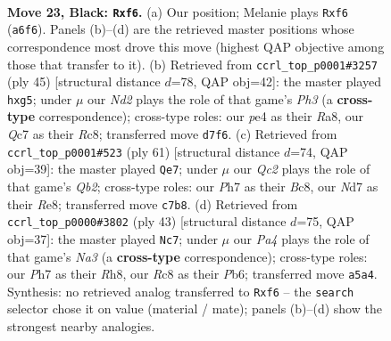 \documentclass[11pt]{article}
\begin{document}
\clearpage

\begin{figure}[p]\centering
\begin{subfigure}{0.46\textwidth}\centering
\resizebox{\linewidth}{!}{%
\newchessgame
\chessboard[
  setfen={2r3k1/1bqn1p1p/r4Bp1/pp1Pp3/4P3/1PP3P1/4KP1P/R1Q3NR b - - 0 23},
  showmover=false,
  pgfstyle=straightmove, color=movearrow, markmove={a6-f6}
]}
\caption{}
\end{subfigure}\hfill
\begin{subfigure}{0.46\textwidth}\centering
\resizebox{\linewidth}{!}{%
\newchessgame
\chessboard[
  setfen={r1r3k1/1p1n1pp1/p2pq2p/6B1/PPPPp3/7P/R3QPP1/2R1N1K1 b - - 0 23},
  showmover=false,
  pgfstyle=straightmove, color=movearrow, markmove={h6-g5}
]}
\caption{}
\end{subfigure}
\\[4pt]
\begin{subfigure}{0.46\textwidth}\centering
\resizebox{\linewidth}{!}{%
\newchessgame
\chessboard[
  setfen={1rb1r1k1/1q4np/p2p2p1/2pP1p2/4P3/R4PPP/1PN3B1/1RQ3K1 b - - 0 31},
  showmover=false,
  pgfstyle=straightmove, color=movearrow, markmove={b7-e7}
]}
\caption{}
\end{subfigure}\hfill
\begin{subfigure}{0.46\textwidth}\centering
\resizebox{\linewidth}{!}{%
\newchessgame
\chessboard[
  setfen={2k3rr/p2q3p/np3b1B/n2p1p2/P1pP4/2P5/1P1N2NP/R2Q1R1K b - - 1 22},
  showmover=false,
  pgfstyle=straightmove, color=movearrow, markmove={a6-c7}
]}
\caption{}
\end{subfigure}
\caption{\textbf{Move 23, Black: \texttt{Rxf6}.} (a) Our position; Melanie plays \texttt{Rxf6} (\texttt{a6f6}). Panels (b)--(d) are the retrieved master positions whose correspondence most drove this move (highest QAP objective among those that transfer to it). (b) Retrieved from \texttt{ccrl\_top\_p0001\#3257} (ply 45) [structural distance $d$=78, QAP obj=42]: the master played \texttt{hxg5}; under $\mu$ our \emph{Nd2} plays the role of that game's \emph{Ph3} (a \textbf{cross-type} correspondence); cross-type roles: our \emph{p}e4 as their \emph{R}a8, our \emph{Q}c7 as their \emph{R}c8; transferred move \texttt{d7f6}. (c) Retrieved from \texttt{ccrl\_top\_p0001\#523} (ply 61) [structural distance $d$=74, QAP obj=39]: the master played \texttt{Qe7}; under $\mu$ our \emph{Qc2} plays the role of that game's \emph{Qb2}; cross-type roles: our \emph{P}h7 as their \emph{B}c8, our \emph{N}d7 as their \emph{R}e8; transferred move \texttt{c7b8}. (d) Retrieved from \texttt{ccrl\_top\_p0000\#3802} (ply 43) [structural distance $d$=75, QAP obj=37]: the master played \texttt{Nc7}; under $\mu$ our \emph{Pa4} plays the role of that game's \emph{Na3} (a \textbf{cross-type} correspondence); cross-type roles: our \emph{P}h7 as their \emph{R}h8, our \emph{R}c8 as their \emph{P}b6; transferred move \texttt{a5a4}. Synthesis: no retrieved analog transferred to \texttt{Rxf6} -- the \texttt{search} selector chose it on value (material / mate); panels (b)--(d) show the strongest nearby analogies.}
\label{fig:thought-m45}
\end{figure}
\end{document}
